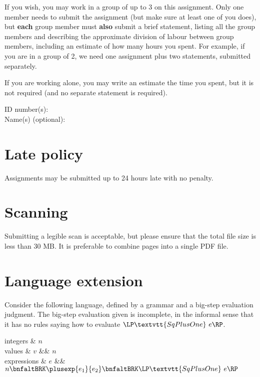 \gdef\lecturenumber{a2}
\gdef\subsectioncounters{1}


\newcommand{\blanks}[1]{\ensuremath{\dashuline{\hspace{#1}}}}

\newcommand{\sqplusoneexp}[1]{\LP \textvtt{SqPlusOne}~{#1}\RP}


\date{due: Friday, 2022--02--11}
\vspace*{-2ex}

If you wish, you may work in a group of up to 3 on this assignment.
Only one member needs to submit the assignment (but make sure at least one of you does),
but \textbf{each} group member must \textbf{also} submit a brief statement,
listing all the group members and describing
the approximate division of labour between group members, including an estimate of how
many hours you spent.  For example, if you are in a group of 2, we need one assignment
plus two statements, submitted separately.

If you are working alone, you may write an estimate the time you spent, but it is not required
(and no separate statement is required).

\bigskip

{\noindent ID number(s):} \\[1ex]

{\noindent Name(s) (optional):}


\section*{Late policy}

Assignments may be submitted up to 24 hours late with no penalty.


\section*{Scanning}

Submitting a legible scan is acceptable, but please ensure that the total file size is less than 30 MB.
It is preferable to combine pages into a single PDF file.


\clearpage
\section{Language extension}
\label{sec:lang-ext}

Consider the following language, defined by a grammar and a big-step evaluation judgment.
The big-step evaluation given is incomplete, in the informal sense that it has no rules saying how to evaluate
$\sqplusoneexp{e}$.
%
\begin{grammar}
  integers & $n$
  \\
  values & $v$ &\bnfas& $n$
  \\
  expressions & $e$ &\bnfas& 
      $
      n
      \bnfaltBRK
      \plusexp{e_1}{e_2}
      \bnfaltBRK
      \sqplusoneexp{e}
      $
\end{grammar}

